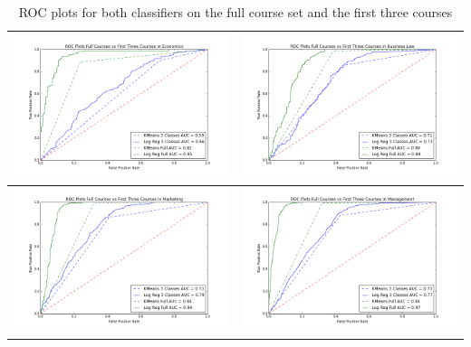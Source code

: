 \documentclass{sigchi}
\begin{document}
\begin{table}[hb]
 \begin{center}
   \begin{tabular}{| c | c |}
   \hline
   \includegraphics[width=0.45\columnwidth]{figures/ROC-Economics.png}
   &
   \includegraphics[width=0.45\columnwidth]{figures/ROC-Business-Law.png}
   \\
   \hline
   \includegraphics[width=0.45\columnwidth]{figures/roc-marketing.png}
	&   
   \includegraphics[width=0.45\columnwidth]{figures/roc-management.png}
   \\
   \hline
   \end{tabular}
 \end{center}
 \caption{ROC plots for both classifiers on the full course set and the first three courses }~\label{tab:rocTable}
\end{table}
\end{document}
